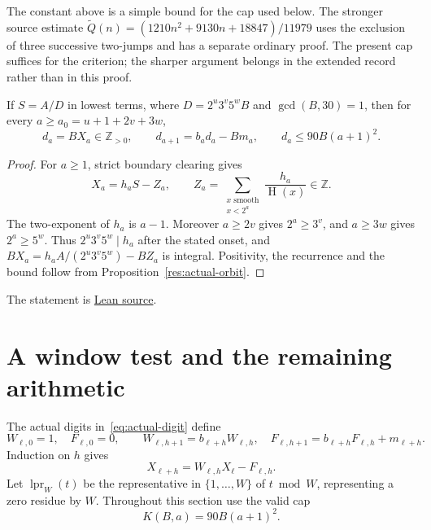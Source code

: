 \documentclass[11pt]{article}
\newcommand{\hgt}{\operatorname{H}}
\begin{document}
The constant above is a simple bound for the cap used below.  The stronger
source estimate
$\widetilde Q(n)=(1210n^2+9130n+18847)/11979$ uses the exclusion of three
successive two-jumps and has a separate ordinary proof.  The present cap
suffices for the criterion; the sharper argument belongs in the extended
record rather than in this proof.

\begin{theorem}
\label{res:denominator-reduction}
If $S=A/D$ in lowest terms, where
$D=2^u3^v5^wB$ and $\gcd(B,30)=1$, then for every
$a\ge a_0=u+1+2v+3w$,
\[
 d_a=BX_a\in\mathbb Z_{>0},\qquad
 d_{a+1}=b_ad_a-Bm_a,\qquad d_a\le90B(a+1)^2.
\]
\end{theorem}
\begin{proof}
For $a\ge1$, strict boundary clearing gives
\begin{equation}\label{eq:prefix-lattice}
 X_a=h_aS-Z_a,\qquad
 Z_a=\sum_{\substack{x\text{ smooth}\\x<2^a}}\frac{h_a}{\hgt(x)}\in\mathbb Z.
\end{equation}
The two-exponent of $h_a$ is $a-1$.  Moreover $a\ge2v$ gives
$2^a\ge3^v$, and $a\ge3w$ gives $2^a\ge5^w$.
Thus $2^u3^v5^w\mid h_a$ after the stated onset, and
$BX_a=h_aA/(2^u3^v5^w)-BZ_a$ is integral.  Positivity, the recurrence
and the bound follow from Proposition~\ref{res:actual-orbit}.
\end{proof}

\noindent The statement is \href{https://github.com/wcook04/plectis-erdos/blob/f36a98bf3d3e6f65f1074e3b800e3293d5b8a51a/ErdosProblems/Erdos269/PaperR7RationalBridge.lean#L80}{Lean source}.

\section{A window test and the remaining arithmetic}
\label{sec:escape}\label{sec:open}
The actual digits in~\eqref{eq:actual-digit} define
\[
 W_{\ell,0}=1,\quad F_{\ell,0}=0,\qquad
 W_{\ell,h+1}=b_{\ell+h}W_{\ell,h},\quad
 F_{\ell,h+1}=b_{\ell+h}F_{\ell,h}+m_{\ell+h}.
\]
Induction on $h$ gives
\begin{equation}\label{eq:actual-tail}
 X_{\ell+h}=W_{\ell,h}X_\ell-F_{\ell,h}.
\end{equation}
Let $\operatorname{lpr}_W(t)$ be the representative in $\{1,\ldots,W\}$
of $t\bmod W$, representing a zero residue by $W$.
Throughout this section use the valid cap
\begin{equation}\label{eq:actual-bound}
 K(B,a)=90B(a+1)^2.
\end{equation}
\end{document}
